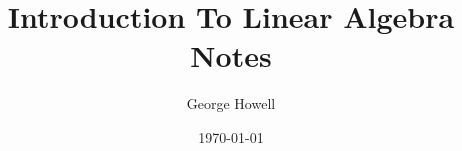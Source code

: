 \documentclass{article}
\title{Introduction To Linear Algebra Notes}
\author{George Howell}
\date{\today}
\begin{document}
    \maketitle
    \newpage

    \tableofcontents
    \newpage

    
    \pagebreak
    
    \pagebreak
    
\end{document}
